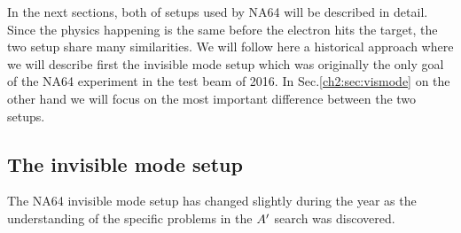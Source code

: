 In the next sections, both of setups used by NA64 will be described in detail. Since the physics happening is the same before the electron hits the target, the two setup share many similarities. We will follow here a historical approach where we will describe first the invisible mode setup which was originally the only goal of the NA64 experiment in the test beam of 2016. In Sec.\ref{ch2:sec:vismode} on the other hand we will focus on the most important difference between the two setups.


\subsection{The invisible mode setup}
\label{ch2:sec:invismode}

The NA64 invisible mode setup has changed slightly during the year as the understanding of the specific problems in the $A'$ search was discovered. 

